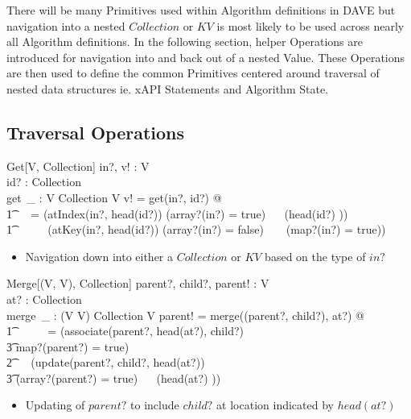 \documentclass[../main.tex]{subfiles}
\begin{document}
There will be many Primitives used within Algorithm definitions in DAVE but
navigation into a nested $Collection$ or $KV$ is most likely to be used
across nearly all Algorithm definitions. In the following section,
helper Operations are introduced for navigation into and back out of a
nested Value. These Operations are then used to define the common Primitives centered around
traversal of nested data structures ie. xAPI Statements and Algorithm State.

\subsection{Traversal Operations}
\begin{schema}{Get[V, Collection]}
  in?, v! : V \\
  id? : Collection \\
  get~\_ : V \cross Collection \surj V
  \where
  v! = get(in?, id?) @\\
  \t1 \ ~  = (atIndex(in?, head(id?)) \iff (array?(in?) = true) ~\land~ (head(id?) \in \nat)) ~\lor \\
  \t1 \ \ \ \ ~ (atKey(in?, head(id?)) \iff (array?(in?) = false) ~ \land ~ (map?(in?) = true))
\end{schema}
\begin{itemize}
  \item Navigation down into either a $Collection$ or $KV$ based on the type of $in?$
\end{itemize}
\begin{schema}{Merge[(V, V), Collection]}
  parent?, child?, parent! : V \\
  at? : Collection \\
  merge~\_ : (V \cross V) \cross Collection \bij V
  \where
  parent! = merge((parent?, child?), at?) @ \\
  \t1 \ \ \ \ ~ = (associate(parent?, head(at?), child?) \\
  \t3 \iff map?(parent?) = true) ~ \lor \\
  \t2 \ ~ (update(parent?, child?, head(at?)) \\
  \t3 \iff (array?(parent?) = true) ~\land~ (head(at?) \in \nat))
\end{schema}
\begin{itemize}
  \item Updating of $parent?$ to include $child?$ at location indicated by $head(at?)$
\end{itemize}
\end{document}
